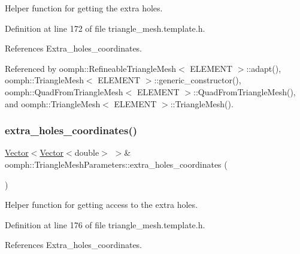 Helper function for getting the extra holes. 



Definition at line 172 of file triangle\+\_\+mesh.\+template.\+h.



References Extra\+\_\+holes\+\_\+coordinates.



Referenced by oomph\+::\+Refineable\+Triangle\+Mesh$<$ E\+L\+E\+M\+E\+N\+T $>$\+::adapt(), oomph\+::\+Triangle\+Mesh$<$ E\+L\+E\+M\+E\+N\+T $>$\+::generic\+\_\+constructor(), oomph\+::\+Quad\+From\+Triangle\+Mesh$<$ E\+L\+E\+M\+E\+N\+T $>$\+::\+Quad\+From\+Triangle\+Mesh(), and oomph\+::\+Triangle\+Mesh$<$ E\+L\+E\+M\+E\+N\+T $>$\+::\+Triangle\+Mesh().

\mbox{\label{classoomph_1_1TriangleMeshParameters_a793b4fa299786e9d95c05ab7fb4a2c0c}} 
\subsubsection{\texorpdfstring{extra\+\_\+holes\+\_\+coordinates()}{extra\_holes\_coordinates()}\hspace{0.1cm}{\footnotesize\ttfamily [2/2]}}
{\footnotesize\ttfamily \hyperlink{classoomph_1_1Vector}{Vector}$<$\hyperlink{classoomph_1_1Vector}{Vector}$<$double$>$ $>$\& oomph\+::\+Triangle\+Mesh\+Parameters\+::extra\+\_\+holes\+\_\+coordinates (\begin{DoxyParamCaption}{ }\end{DoxyParamCaption})\hspace{0.3cm}{\ttfamily [inline]}}



Helper function for getting access to the extra holes. 



Definition at line 176 of file triangle\+\_\+mesh.\+template.\+h.



References Extra\+\_\+holes\+\_\+coordinates.

\mbox{\label{classoomph_1_1TriangleMeshParameters_a0026fe3e01ba436e993bfd19663d4fbc}} 
